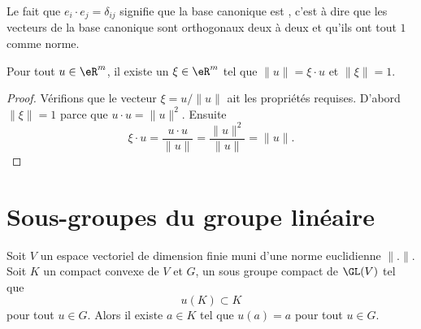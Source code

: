 Le fait que $e_i\cdot e_j=\delta_{ij}$ signifie que la base canonique est , c'est à dire que les vecteurs de la base canonique sont orthogonaux deux à deux et qu'ils ont tout $1$ comme norme.

\begin{lemma}\label{LemSclNormeXi}
	Pour tout $u\in\eR^m$, il existe un $\xi\in\eR^m$ tel que $\| u \|=\xi\cdot u$ et $\| \xi \|=1$.
\end{lemma}

\begin{proof}
	Vérifions que le vecteur $\xi=u/\| u \|$ ait les propriétés requises. D'abord $\| \xi \|=1$ parce que $u\cdot u=\| u \|^2$. Ensuite
	\begin{equation}
		\xi\cdot u=\frac{ u\cdot u }{ \| u \| }=\frac{ \| u \|^2 }{ \| u \| }=\| u \|.
	\end{equation}
\end{proof}



\section{Sous-groupes du groupe linéaire}

\begin{lemma}       \label{LemOCtdiaE}
    Soit \( V\) un espace vectoriel de dimension finie muni d'une norme euclidienne \( \| . \|\). Soit \( K\) un compact convexe de \( V\) et \( G\), un sous groupe compact de \( \GL(V)\) tel que
    \begin{equation}
        u(K)\subset K
    \end{equation}
    pour tout \( u\in G\). Alors il existe \( a\in K\) tel que \( u(a)=a\) pour tout \( u\in G\).
\end{lemma}


